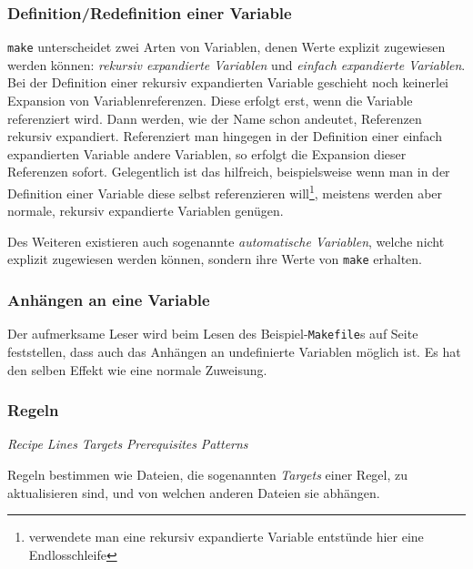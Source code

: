 	\subsubsection*{Definition/Redefinition einer Variable}
		
		\texttt{make} unterscheidet zwei Arten von Variablen, denen Werte
		explizit zugewiesen werden können: \emph{rekursiv expandierte Variablen}
		und \emph{einfach expandierte Variablen}.
		Bei der Definition einer rekursiv expandierten Variable geschieht noch
		keinerlei Expansion von Variablenreferenzen. Diese erfolgt erst, wenn
		die Variable referenziert wird. Dann werden, wie der Name schon
		andeutet, Referenzen rekursiv expandiert.
		Referenziert man hingegen in der Definition einer einfach expandierten
		Variable andere Variablen, so erfolgt die Expansion dieser Referenzen
		sofort. Gelegentlich ist das hilfreich, beispielsweise wenn man in der
		Definition einer Variable diese selbst referenzieren
		will\footnote{verwendete man eine rekursiv expandierte Variable
		entstünde hier eine Endlosschleife}, meistens werden aber normale,
		rekursiv expandierte Variablen genügen.

		Des Weiteren existieren auch sogenannte \emph{automatische Variablen},
		welche nicht explizit zugewiesen werden können, sondern ihre Werte von
		\texttt{make} erhalten.

	\subsubsection*{Anhängen an eine Variable}
		
		Der aufmerksame Leser wird beim Lesen des Beispiel-\texttt{Makefile}s
		auf Seite~\pageref{subsubsection:examplemakefile} feststellen, dass
		auch das Anhängen an undefinierte Variablen möglich ist. Es hat den
		selben Effekt wie eine normale Zuweisung.

	\subsubsection*{Regeln}
		
		\textit{Recipe Lines} 
		\textit{Targets} 
		\textit{Prerequisites} 
		\clearpage
		\textit{Patterns} 

		Regeln bestimmen wie Dateien, die sogenannten \emph{Targets} einer
		Regel, zu aktualisieren sind, und von welchen anderen Dateien sie
		abhängen.

